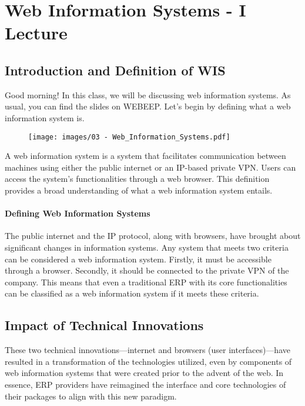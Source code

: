 \section{Web Information Systems - I Lecture}

\subsection{Introduction and Definition of WIS}\label{introduction-to-web-information-systems}

Good morning! In this class, we will be discussing web information
systems. As usual, you can find the slides on WEBEEP. Let's begin by
defining what a web information system is.

\begin{figure}[!h]
  \centering
  \texttt{[image: images/03 - Web\_Information\_Systems.pdf]}
\end{figure}

A web information system is a system that facilitates communication
between machines using either the public internet or an IP-based private
VPN. Users can access the system's functionalities through a web
browser. This definition provides a broad understanding of what a web
information system entails.

\paragraph*{Defining Web Information Systems}
The public internet and the IP protocol, along with browsers, have
brought about significant changes in information systems. Any system
that meets two criteria can be considered a web information system.
Firstly, it must be accessible through a browser. Secondly, it should be
connected to the private VPN of the company. This means that even a
traditional ERP with its core functionalities can be classified as a web
information system if it meets these criteria.


\subsection{Impact of Technical Innovations}
These two technical
innovations---internet and browsers (user interfaces)---have resulted in a transformation of the technologies
utilized, even by components of web information systems that were
created prior to the advent of the web. In essence, ERP providers have
reimagined the interface and core technologies of their packages to
align with this new paradigm.

